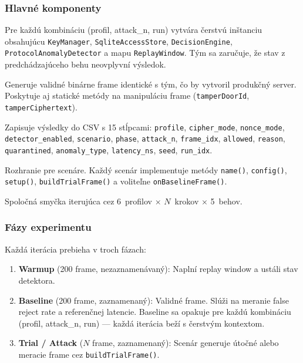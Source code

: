 \subsubsection{Hlavné komponenty}

\begin{description}[leftmargin=*,itemsep=2pt]
  \item[\texttt{ExperimentContext}:] Pre každú kombináciu (profil, attack\_n, run) vytvára čerstvú inštanciu obsahujúcu \texttt{KeyManager}, \texttt{SqliteAccessStore}, \texttt{DecisionEngine}, \texttt{ProtocolAnomalyDetector} a mapu \texttt{ReplayWindow}. Tým sa zaručuje, že stav z predchádzajúceho behu neovplyvní výsledok.
  \item[\texttt{FrameFactory}:] Generuje validné binárne frame identické s tým, čo by vytvoril produkčný server. Poskytuje aj statické metódy na manipuláciu frame (\texttt{tamperDoorId}, \texttt{tamperCiphertext}).
  \item[\texttt{MetricsCollector}:] Zapisuje výsledky do CSV s 15 stĺpcami: \texttt{profile}, \texttt{cipher\_mode}, \texttt{nonce\_mode}, \texttt{detector\_enabled}, \texttt{scenario}, \texttt{phase}, \texttt{attack\_n}, \texttt{frame\_idx}, \texttt{allowed}, \texttt{reason}, \texttt{quarantined}, \texttt{anomaly\_type}, \texttt{latency\_ns}, \texttt{seed}, \texttt{run\_idx}.
  \item[\texttt{IScenario}:] Rozhranie pre scenáre. Každý scenár implementuje metódy \texttt{name()}, \texttt{config()}, \texttt{setup()}, \texttt{buildTrialFrame()} a voliteľne \texttt{onBaselineFrame()}.
  \item[\texttt{runScenario()}:] Spoločná smyčka iterujúca cez 6~profilov $\times$ $N$~krokov $\times$ 5~behov.
\end{description}

\subsubsection{Fázy experimentu}

Každá iterácia prebieha v troch fázach:

\begin{enumerate}[leftmargin=*,itemsep=2pt]
  \item \textbf{Warmup} (200 frame, nezaznamenávaný): Naplní replay window a ustáli stav detektora.
  \item \textbf{Baseline} (200 frame, zaznamenaný): Validné frame. Slúži na meranie false reject rate a referenčnej latencie. Baseline sa opakuje pre každú kombináciu (profil, attack\_n, run) --- každá iterácia beží s čerstvým kontextom.
  \item \textbf{Trial / Attack} ($N$ frame, zaznamenaný): Scenár generuje útočné alebo meracie frame cez \texttt{buildTrialFrame()}.
\end{enumerate}

